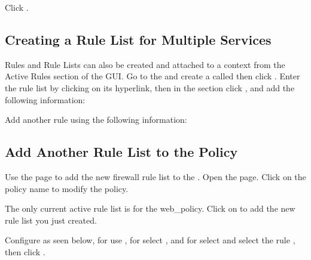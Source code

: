 \documentclass[letterpaper,10pt,english]{sphinxmanual}
\begin{document}

Click .


\subsection{Creating a Rule List for Multiple Services}
\label{\detokenize{class1/module1/lab5::doc}}\label{\detokenize{class1/module1/lab5:creating-a-rule-list-for-multiple-services}}
Rules and Rule Lists can also be created and attached to a context from
the Active Rules section of the GUI. Go to the  and create a  called
 then click . Enter the
rule list by clicking on its hyperlink, then in the  section
click , and add the following information:


Add another rule using the following information:




\subsection{Add Another Rule List to the Policy}
\label{\detokenize{class1/module1/lab5:add-another-rule-list-to-the-policy}}
Use the  page to add the new firewall rule list to the
. Open the  page. Click on the policy name to modify the policy.

The only current active rule list is for the web\_policy. Click on
 to add the new rule list you just created.

Configure as seen below, for  use
, for  select 
, and for  select  and select
the rule , then click .
\end{document}
